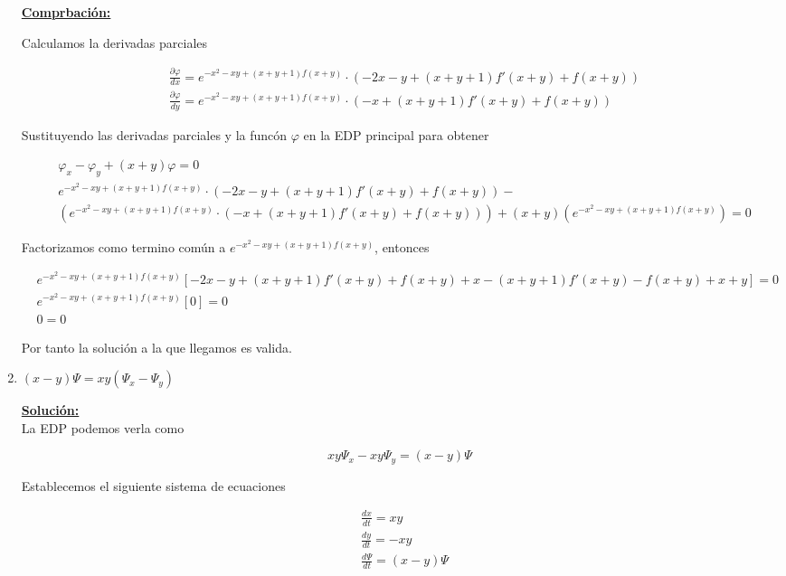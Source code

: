 \documentclass{article}
\begin{document}
\begin{enumerate}
					{\bf\underline{Comprbación:}}
						
						Calculamos la derivadas parciales
							
							\begin{align*}
								&\frac{\partial \varphi}{dx} = e^{-x^2-xy +(x+y+1)f(x+y)} \cdot (-2x-y+(x+y+1)f'(x+y)+f(x+y))\\
								&\frac{\partial \varphi}{dy} = e^{-x^2-xy +(x+y+1)f(x+y)} \cdot (-x+(x+y+1)f'(x+y)+f(x+y))
							\end{align*}
						
						Sustituyendo las derivadas parciales y la funcón $\varphi$ en la EDP principal para obtener
							
							\begin{align*}
								&\varphi _x -\varphi _y +(x+y)\varphi =0\\
								&e^{-x^2-xy +(x+y+1)f(x+y)} \cdot (-2x-y+(x+y+1)f'(x+y)+f(x+y)) - \\
								&\left( e^{-x^2-xy +(x+y+1)f(x+y)} 									\cdot (-x+(x+y+1)f'(x+y)+f(x+y)) \right) +(x+y)(e^{-x^2-xy +(x+y+1)f(x+y)})=0
							\end{align*}
						
						Factorizamos como termino común a $e^{-x^2-xy +(x+y+1)f(x+y)}$, entonces
							
							\begin{align*}
								&e^{-x^2-xy +(x+y+1)f(x+y)} \left[ -2x-y+(x+y+1)f'(x+y)+f(x+y) +x-(x+y+1)f'(x+y)-f(x+y)+x+y \right]=0\\
								&e^{-x^2-xy +(x+y+1)f(x+y)} [0] =0\\
								&0=0
							\end{align*}
						
						Por tanto la solución a la que llegamos es valida.
						
					
					
			\item $(x-y)\Psi =xy(\Psi _x -\Psi _y)$
				
				{\bf\underline{Solución:}}\\
				
					La EDP podemos verla como
						
						\begin{equation*}
							xy\Psi _x -xy\Psi _y =(x-y)\Psi 
						\end{equation*}
					
					Establecemos el siguiente sistema de ecuaciones
						
						\begin{align}
							&\frac{dx}{dt} = xy\\
							&\frac{dy}{dt} =-xy\\
							&\frac{d \Psi}{dt} = (x-y)\Psi
						\end{align}
					

\end{enumerate}
\end{document}
